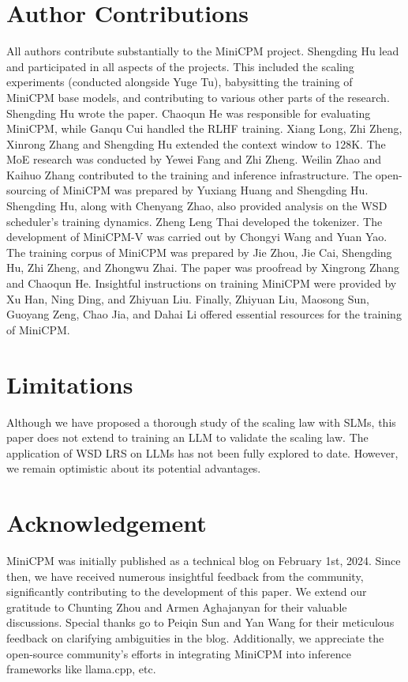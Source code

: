 
\section*{Author Contributions}
All authors contribute substantially to the MiniCPM project. Shengding Hu lead and participated in all aspects of the projects. This included the scaling experiments (conducted alongside Yuge Tu), babysitting the training of MiniCPM base models, and contributing to various other parts of the research.  Shengding Hu wrote the paper. Chaoqun He was responsible for evaluating MiniCPM, while Ganqu Cui handled the RLHF training. Xiang Long, Zhi Zheng, Xinrong Zhang and Shengding Hu extended the context window to 128K. The MoE research was conducted by  Yewei Fang and Zhi Zheng. Weilin Zhao and Kaihuo Zhang contributed to the training and inference infrastructure. The open-sourcing of MiniCPM was prepared by Yuxiang Huang and Shengding Hu. Shengding Hu, along with Chenyang Zhao, also provided analysis on the WSD scheduler's training dynamics. Zheng Leng Thai developed the tokenizer. The development of MiniCPM-V was carried out by Chongyi Wang and Yuan Yao.
The training corpus of MiniCPM was prepared by Jie Zhou, Jie Cai, Shengding Hu, Zhi Zheng, and Zhongwu Zhai. The paper was proofread by Xingrong Zhang and Chaoqun He.
Insightful instructions on training MiniCPM were provided by Xu Han, Ning Ding, and Zhiyuan Liu. Finally, Zhiyuan Liu, Maosong Sun, Guoyang Zeng, Chao Jia, and Dahai Li offered essential resources for the training of MiniCPM.

\section*{Limitations}
Although we have proposed a thorough study of the scaling law with SLMs, this paper does not extend to training an LLM to validate the scaling law. The application of WSD LRS on LLMs has not been fully explored to date. However, we remain optimistic about its potential advantages.

\section*{Acknowledgement}
MiniCPM was initially published as a technical blog on February 1st, 2024. Since then, we have received numerous insightful feedback from the community, significantly contributing to the development of this paper. We extend our gratitude to Chunting Zhou and Armen Aghajanyan for their valuable discussions. Special thanks go to Peiqin Sun and Yan Wang for their meticulous feedback on clarifying ambiguities in the blog. Additionally, we appreciate the open-source community's efforts in integrating MiniCPM into inference frameworks like llama.cpp, etc. 